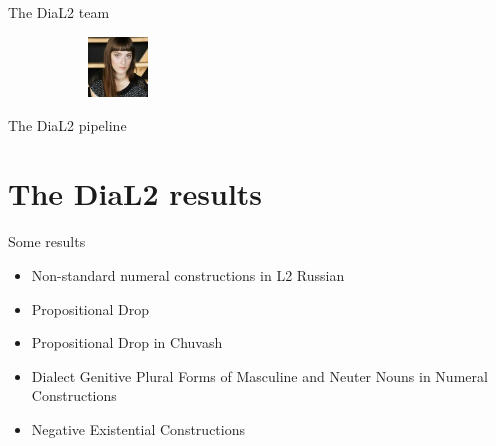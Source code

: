 \documentclass[
  ignorenonframetext,
  t]{beamer}
\providecommand{\tightlist}{%
  \setlength{\itemsep}{0pt}\setlength{\parskip}{0pt}}\usepackage{longtable,booktabs,array}
\begin{document}
\begin{frame}{The DiaL2 team}
\begin{figure}
\begin{minipage}{0.25\linewidth}
\begin{figure}[H]

{\centering \includegraphics[width=0.63in,height=\textheight]{images/zemicheva.jpeg}

}


\end{figure}%

\end{minipage}%

\end{figure}%
\end{frame}

\begin{frame}{The DiaL2 pipeline}
\label{the-dial2-pipeline}
\end{frame}

\section{The DiaL2 results}\label{the-dial2-results}

\begin{frame}{Some results}
\label{some-results}
\begin{itemize}
\tightlist
\item
  Non-standard numeral constructions in L2 Russian
\item
  Propositional Drop
\item
  Propositional Drop in Chuvash
\item
  Dialect Genitive Plural Forms of Masculine and Neuter Nouns in Numeral
  Constructions
\item
  Negative Existential Constructions
\end{itemize}
\end{frame}
\end{document}
